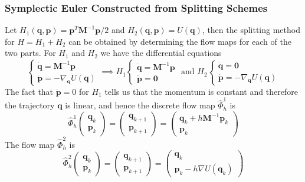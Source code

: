     \subsubsection{Symplectic Euler Constructed from Splitting Schemes}

      Let $H_1 (\mathbf{q}, \mathbf{p}) = \mathbf{p}^T \mathbf{M}^{-1} \mathbf{p}/2$ and $H_2 (\mathbf{q}, \mathbf{p}) = U(\mathbf{q})$, then the splitting method for $H = H_1 + H_2$ can be obtained by determining the flow maps for each of the two parts. For $H_1$ and $H_2$ we have the differential equations 
      \begin{equation}
        \begin{cases} \boldsymbol{\dot{q}} = \mathbf{M}^{-1} \mathbf{p} \\ \boldsymbol{\dot{p}} = - \nabla_\mathbf{q} U (\mathbf{q}) \end{cases} \implies H_1 \begin{cases} \boldsymbol{\dot{q}} = \mathbf{M}^{-1} \mathbf{p} \\ \boldsymbol{\dot{p}} = \mathbf{0} \end{cases} \text{ and } H_2 \begin{cases} \boldsymbol{\dot{q}} = \mathbf{0} \\ \boldsymbol{\dot{p}} = - \nabla_\mathbf{q} U (\mathbf{q}) \end{cases}
      \end{equation}
      The fact that $\boldsymbol{\dot{p}} = 0$ for $H_1$ tells us that the momentum is constant and therefore the trajectory $\mathbf{q}$ is linear, and hence the discrete flow map $\hat{\Phi}_h^1$ is 
      \begin{equation}
        \hat{\Phi}_h^1 \begin{pmatrix} \mathbf{q}_k \\ \mathbf{p}_k \end{pmatrix} = \begin{pmatrix} \mathbf{q}_{k+1} \\ \mathbf{p}_{k+1} \end{pmatrix} = \begin{pmatrix} \mathbf{q}_k + h \mathbf{M}^{-1} \mathbf{p}_k \\ \mathbf{p}_k \end{pmatrix}
      \end{equation}
      The flow map $\hat{\Phi}_h^2$ is 
      \begin{equation}
        \hat{\Phi}_h^2 \begin{pmatrix} \mathbf{q}_k \\ \mathbf{p}_k \end{pmatrix} = \begin{pmatrix} \mathbf{q}_{k+1} \\ \mathbf{p}_{k+1} \end{pmatrix} = \begin{pmatrix} \mathbf{q}_k \\ \mathbf{p}_k - h \nabla U (\mathbf{q}_k) \end{pmatrix}
      \end{equation}
